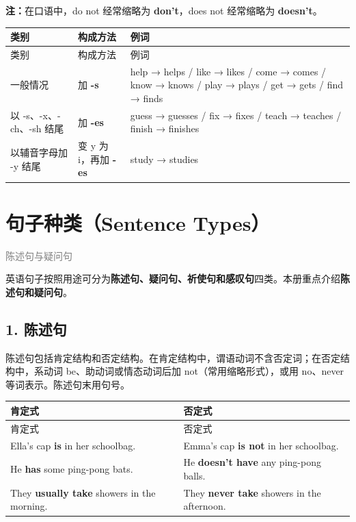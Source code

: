 \documentclass[11pt,a4paper]{ctexart}
\begin{document}
\textbf{注：}在口语中，do not 经常缩略为 \textbf{don’t}，does not 经常缩略为 \textbf{doesn’t}。

{\footnotesize
\begin{longtable}{p{4.47cm}p{4.47cm}p{4.47cm}}
\hline
类别 & 构成方法 & 例词 \\
\hline
\endfirsthead
\hline
类别 & 构成方法 & 例词 \\
\hline
\endhead
\hline
\endfoot
一般情况 & 加 \textbf{-s} & help → helps / like → likes / come → comes / know → knows / play → plays / get → gets / find → finds \\
以 -s、-x、-ch、-sh 结尾 & 加 \textbf{-es} & guess → guesses / fix → fixes / teach → teaches / finish → finishes \\
以辅音字母加 -y 结尾 & 变 y 为 i，再加 \textbf{-es} & study → studies \\
\end{longtable}
}

\begin{center}\end{center}

\section{句子种类（Sentence Types）}
\noindent\textcolor{gray}{陈述句与疑问句}\par\smallskip
英语句子按照用途可分为\textbf{陈述句、疑问句、祈使句和感叹句}四类。本册重点介绍\textbf{陈述句和疑问句}。

\subsection*{1. 陈述句}

陈述句包括肯定结构和否定结构。在肯定结构中，谓语动词不含否定词；在否定结构中，系动词 be、助动词或情态动词后加 not（常用缩略形式），或用 no、never 等词表示。陈述句末用句号。

{\footnotesize
\begin{longtable}{p{6.70cm}p{6.70cm}}
\hline
肯定式 & 否定式 \\
\hline
\endfirsthead
\hline
肯定式 & 否定式 \\
\hline
\endhead
\hline
\endfoot
Ella’s cap \textbf{is} in her schoolbag. & Emma’s cap \textbf{is not} in her schoolbag. \\
He \textbf{has} some ping-pong bats. & He \textbf{doesn’t have} any ping-pong balls. \\
They \textbf{usually take} showers in the morning. & They \textbf{never take} showers in the afternoon. \\
\end{longtable}
}
\end{document}

